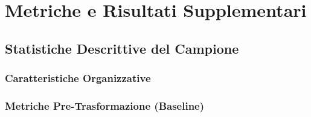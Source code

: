 \chapter{\texorpdfstring{\textbf{Metriche e Risultati Supplementari}}{Appendice B - Metriche e Risultati Supplementari}}
\label{app:metriche}

\section{\texorpdfstring{\textbf{Statistiche Descrittive del Campione}}{Statistiche Descrittive del Campione}}

\subsection{\texorpdfstring{\textbf{Caratteristiche Organizzative}}{Caratteristiche Organizzative}}

\begin{table}[htbp]
\centering
\caption{Statistiche descrittive delle organizzazioni partecipanti}
\label{tab:stats_descrittive}
\end{table}

\subsection{\texorpdfstring{\textbf{Metriche Pre-Trasformazione (Baseline)}}{Metriche Pre-Trasformazione (Baseline)}}

